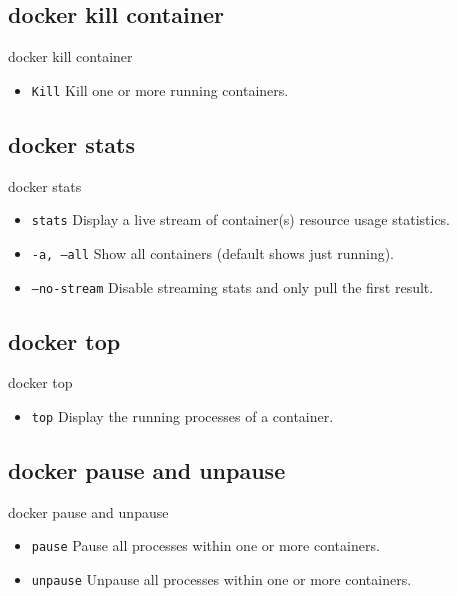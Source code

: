 \subsection{docker kill container}\label{subsec:docker-kill-container}
\begin{frame}{docker kill container}
    \begin{itemize}
        \item \texttt{Kill} Kill one or more running containers.
        
    \end{itemize}
\end{frame}

\subsection{docker stats}\label{subsec:docker-stats}
\begin{frame}{docker stats}
    \begin{itemize}
        \item \texttt{stats} Display a live stream of container(s) resource usage statistics.
        \item \texttt{-a, --all} Show all containers (default shows just running).
        \item \texttt{--no-stream} Disable streaming stats and only pull the first result.
        
    \end{itemize}
\end{frame}

\subsection{docker top}\label{subsec:docker-top}
\begin{frame}{docker top}
    \begin{itemize}
        \item \texttt{top} Display the running processes of a container.
        
    \end{itemize}
\end{frame}

\subsection{docker pause and unpause}\label{subsec:docker-pause-and-unpause}
\begin{frame}{docker pause and unpause}
    \begin{itemize}
        \item \texttt{pause} Pause all processes within one or more containers.
        \item \texttt{unpause} Unpause all processes within one or more containers.
        
    \end{itemize}
\end{frame}

